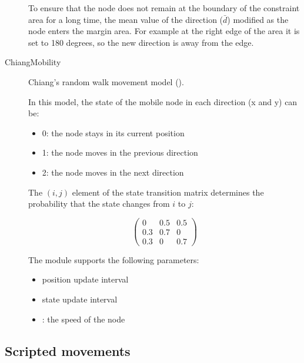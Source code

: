 \begin{description}
To ensure that the node does not remain at the boundary of the constraint
area for a long time, the mean value of the direction ($\bar{d}$) modified
as the node enters the margin area. For example at the right edge of the
area it is set to 180 degrees, so the new direction is away from the edge.


\item[ChiangMobility] Chiang's random walk movement model
(\cite{Chiang98wirelessnetwork}).

In this model, the state of the mobile node in each direction (x and y) can be:

\begin{itemize}
  \item 0: the node stays in its current position
  \item 1: the node moves in the previous direction
  \item 2: the node moves in the next direction
\end{itemize}

The $(i,j)$ element of the state transition matrix determines the
probability that the state changes from $i$ to $j$:

$$ \left(
\begin{array}{ccc}
  0 & 0.5 & 0.5 \\
  0.3 & 0.7 & 0 \\
  0.3 & 0 & 0.7
\end{array}
\right) $$

The  module supports the following parameters:
\begin{itemize}
  \item {} position update interval
  \item {} state update interval
  \item {}: the speed of the node
\end{itemize}



\end{description}

\subsection{Scripted movements}

